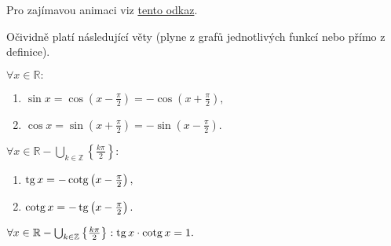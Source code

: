 \begin{pozn}
    Pro zajímavou animaci viz \href{https://upload.wikimedia.org/wikipedia/commons/3/3b/Circle_cos_sin.gif}{tento odkaz}.
\end{pozn}

\begin{pozn}
    Očividně platí následující věty (plyne z grafů jednotlivých funkcí nebo přímo z definice).
\end{pozn}

\begin{veta}
  $\forall x \in \mathbb{R}:$
  \begin{enumerate}[$i.$]
    \item $\sin x = \cos \left(x- \frac{\pi}{2}\right)=-\cos\left(x+\frac{\pi}{2}\right),$
 	\item $\cos x = \sin \left(x+\frac{\pi}{2}\right)=-\sin \left(x- \frac{\pi}{2} \right).$
  \end{enumerate}
\end{veta}

\begin{veta}
  $\forall x \in \mathbb{R}-\bigcup_{k\in \mathbb Z} \left \{ \frac{k\pi}{2} \right \} :$
  \begin{enumerate}[$i.$]
    \item $\operatorname{tg} x = -\operatorname{cotg} \left ( x- \frac{\pi}{2} \right ), $
 	\item $\operatorname{cotg} x = -\operatorname{tg} \left ( x- \frac{\pi}{2} \right ) .$
  \end{enumerate}
\end{veta}

\begin{veta}
  $\forall x \in \mathbb{R}-\bigcup_{k\in \mathbb Z} \left \{ \frac{k\pi}{2} \right \}: \operatorname{tg} x \cdot \operatorname{cotg} x = 1.$
\end{veta}
